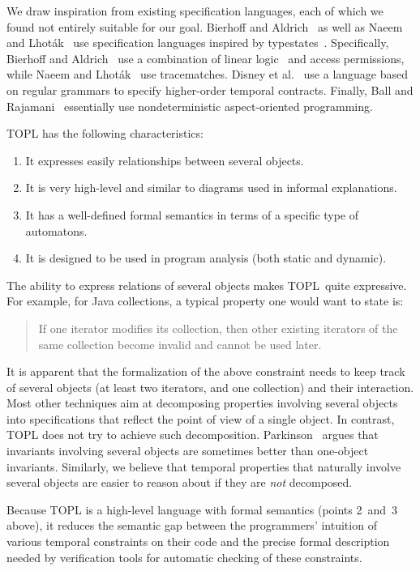 \documentclass{sigplanconf} %
\newcommand{\TPL}{TOPL}
\theoremstyle{definition}
\theoremstyle{remark}
\begin{document}
We draw inspiration from existing specification languages, each of which we found not entirely suitable for our goal.
Bierhoff and Aldrich~\cite{dblp:conf/oopsla/bierhoffa07} as well as Naeem and Lhot\'ak~\cite{dblp:conf/oopsla/naeeml08} use specification languages inspired by typestates~\cite{strom1986}.
Specifically, Bierhoff and Aldrich~\cite{dblp:conf/oopsla/bierhoffa07} use a combination of linear logic~\cite{dblp:journals/tcs/girard87} and access permissions, while Naeem and Lhot\'ak~\cite{dblp:conf/oopsla/naeeml08} use tracematches.
Disney et al.~\cite{disney2011} use a language based on regular grammars to specify higher-order temporal contracts.
Finally, Ball and Rajamani~\cite{ball2002} essentially use nondeterministic aspect-oriented programming.

TOPL has the following characteristics:
\begin{enumerate}
\item It expresses easily relationships between several objects.
\item It is very high-level and similar to diagrams used in informal explanations.
\item It has a well-defined formal semantics in terms of a specific type of automatons.
\item It is designed to be used in program analysis (both static and dynamic).
\end{enumerate}
The ability to express relations of several objects makes \TPL\ quite expressive.
For example, for Java collections, a typical property one would want to state is:
\begin{quote}
If one iterator modifies its collection, then other existing iterators of the same collection become invalid and cannot be used later.
\end{quote}
\noindent
It is apparent that the formalization of the above constraint needs to keep track of several objects (at least two iterators, and one collection) and their interaction.
Most other techniques aim at decomposing properties involving several objects into specifications that reflect the point of view of a single object.
In contrast, TOPL does not try to achieve such decomposition.
Parkinson~\cite{parkinson-iwaco2007} argues that invariants involving several objects are sometimes better than one-object invariants.
Similarly, we believe that temporal properties that naturally involve several objects are easier to reason about if they are \emph{not} decomposed.

Because TOPL is a high-level language with formal semantics (points 2~and~3 above), it reduces the semantic gap between the programmers' intuition of various temporal constraints on their code and the precise formal description needed by verification tools for automatic checking of these constraints.
\end{document}
